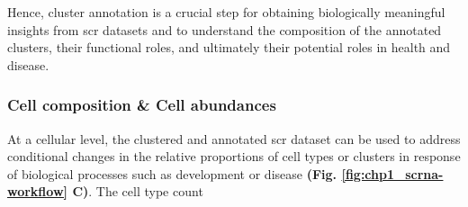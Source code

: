 \par Hence, cluster annotation is a crucial step for obtaining biologically meaningful insights from \gls{scr} datasets and to understand the composition of the annotated clusters, their functional roles, and ultimately their potential roles in health and disease.


\subsubsection{Cell composition \& Cell abundances}
At a cellular level, the clustered and annotated \gls{scr} dataset can be used to address conditional changes in the relative proportions of cell types or clusters in response of biological processes such as development or disease \textbf{(Fig. \ref{fig:chp1_scrna-workflow} C)}. %
The cell type count 

